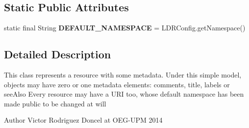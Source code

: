 \subsection*{Static Public Attributes}
\begin{DoxyCompactItemize}
\item 
\hypertarget{classodrlmodel_1_1_metadata_object_a0b03d4d29c9c15c92e39b371c3cfa841}{static final String {\bfseries D\-E\-F\-A\-U\-L\-T\-\_\-\-N\-A\-M\-E\-S\-P\-A\-C\-E} = L\-D\-R\-Config.\-get\-Namespace()}\label{classodrlmodel_1_1_metadata_object_a0b03d4d29c9c15c92e39b371c3cfa841}

\end{DoxyCompactItemize}


\subsection{Detailed Description}
This class represents a resource with some metadata. Under this simple model, objects may have zero or one metadata elements\-: comments, title, labels or see\-Also Every resource may have a U\-R\-I too, whose default namespace has been made public to be changed at will \begin{DoxyAuthor}{Author}
Victor Rodriguez Doncel at O\-E\-G-\/\-U\-P\-M 2014 
\end{DoxyAuthor}


